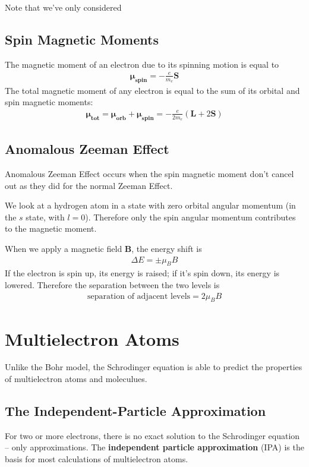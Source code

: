 \documentclass[10pt]{article}
\begin{document}
Note that we've only considered 

\subsection{Spin Magnetic Moments}
The magnetic moment of an electron due to its spinning motion is equal to
\begin{align}
    \boldsymbol{\mu_{spin}} = -\frac{e}{m_e} \mathbf{S}
\end{align}
The total magnetic moment of any electron is equal to the sum of its orbital and spin magnetic moments:
\begin{align}
    \boldsymbol{\mu_{tot}} = \boldsymbol{\mu_{orb}} + \boldsymbol{\mu_{spin}} = -\frac{e}{2m_e} (\mathbf{L} + 2\mathbf{S})  
\end{align}



\subsection{Anomalous Zeeman Effect}
Anomalous Zeeman Effect occurs when the spin magnetic moment don't cancel out as they did for the normal Zeeman Effect.

We look at a hydrogen atom in a state with zero orbital angular momentum (in the $s$ state, with $l = 0$). Therefore only the spin angular momentum contributes to the magnetic moment. 

When we apply a magnetic field $\mathbf{B}$, the energy shift is
\begin{align}
    \Delta E = \pm \mu_B B
\end{align}
If the electron is spin up, its energy is raised; if it's spin down, its energy is lowered. Therefore the separation between the two levels is
\begin{align}
    \text{separation of adjacent levels} = 2 \mu_B B
\end{align}



\section{Multielectron Atoms}
Unlike the Bohr model, the Schrodinger equation is able to predict the properties of multielectron atoms and moleculues.

\subsection{The Independent-Particle Approximation}
For two or more electrons, there is no exact solution to the Schrodinger equation -- only approximations. The \textbf{independent particle approximation} (IPA) is the basis for most calculations of multielectron atoms. 
\end{document}
